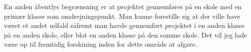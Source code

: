 En anden åbentlys begrænsning er at projektet gennemføres på en skole med en primær klasse som omdrejningspunkt. Man kunne forestille sig at der ville have været et andet udfald såfremt man havde gennemført projektet i en anden klasse på en anden skole, eller blot en anden klasse på den samme skole. Det vil jeg lade være op til fremtidig forskining inden for dette område at afgøre. 




%
